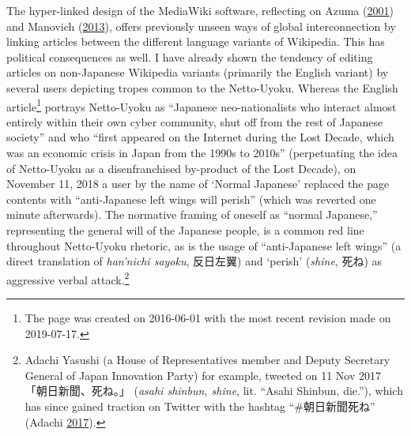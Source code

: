 \documentclass[10pt,british,A4paper,,openany]{memoir}
\begin{document}
The hyper-linked design of the MediaWiki software, reflecting on Azuma
(\protect\hyperlink{ref-azuma_otaku:_2001}{2001}) and Manovich
(\protect\hyperlink{ref-manovich_software_2013}{2013}), offers
previously unseen ways of global interconnection by linking articles
between the different language variants of Wikipedia. This has political
consequences as well. I have already shown the tendency of editing
articles on non-Japanese Wikipedia variants (primarily the English
variant) by several users depicting tropes common to the Netto-Uyoku.
Whereas the English article\footnote{The page was created on 2016-06-01
  with the most recent revision made on 2019-07-17.} portrays
Netto-Uyoku as ``Japanese neo-nationalists who interact almost entirely
within their own cyber community, shut off from the rest of Japanese
society'' and who ``first appeared on the Internet during the Lost
Decade, which was an economic crisis in Japan from the 1990s to 2010s''
(perpetuating the idea of Netto-Uyoku as a disenfranchised by-product of
the Lost Decade), on November 11, 2018 a user by the name of `Normal
Japanese' replaced the page contents with ``anti-Japanese left wings
will perish'' (which was reverted one minute afterwards). The normative
framing of oneself as ``normal Japanese,'' representing the general will
of the Japanese people, is a common red line throughout Netto-Uyoku
rhetoric, as is the usage of ``anti-Japanese left wings'' (a direct
translation of \emph{han'nichi sayoku}, 反日左翼) and `perish'
(\emph{shine}, 死ね) as aggressive verbal attack.\footnote{Adachi
  Yasushi (a House of Representatives member and Deputy Secretary
  General of Japan Innovation Party) for example, tweeted on 11 Nov 2017
  「朝日新聞、死ね。」 (\emph{asahi shinbun, shine}, lit. ``Asahi
  Shinbun, die.''), which has since gained traction on Twitter with the
  hashtag ``\#朝日新聞死ね'' (Adachi
  \protect\hyperlink{ref-adachi_eng._2017}{2017}).}
\end{document}
